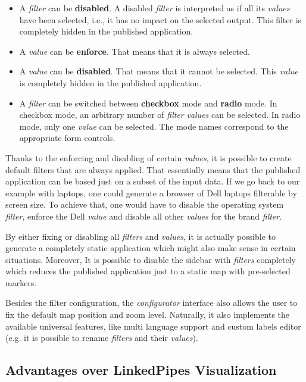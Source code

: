 \begin{itemize}
\item A \emph{filter} can be \textbf{disabled}. A disabled \emph{filter} is interpreted as if all its \emph{values} have been selected, i.e., it has no impact on the selected output. This filter is completely hidden in the published application.
\item A \emph{value} can be \textbf{enforce}. That means that it is always selected.
\item A \emph{value} can be \textbf{disabled}. That means that it cannot be selected. This \emph{value} is completely hidden in the published application.
\item A \emph{filter} can be switched between \textbf{checkbox} mode and \textbf{radio} mode. In checkbox mode, an arbitrary number of \emph{filter} \emph{values} can be selected. In radio mode, only one \emph{value} can be selected. The mode names correspond to the appropriate form controls.

\end{itemize}
Thanks to the enforcing and disabling of certain \emph{values}, it is possible to create default filters that are always applied. That essentially means that the published application can be based just on a subset of the input data. If we go back to our example with laptops, one could generate a browser of Dell laptops filterable by screen size. To achieve that, one would have to disable the operating system \emph{filter}, enforce the Dell \emph{value} and disable all other \emph{values} for the brand \emph{filter}.

By either fixing or disabling all \emph{filters} and \emph{values}, it is actually possible to generate a completely static application which might also make sense in certain situations. Moreover, It is possible to disable the sidebar with \emph{filters} completely which reduces the published application just to a static map with pre-selected markers.

Besides the filter configuration, the \emph{configurator} interface also allows the user to fix the default map position and zoom level. Naturally, it also implements the available universal features, like multi language support and custom labels editor (e.g. it is possible to rename \emph{filters}  and their \emph{values}).


\subsection{Advantages over LinkedPipes Visualization}

